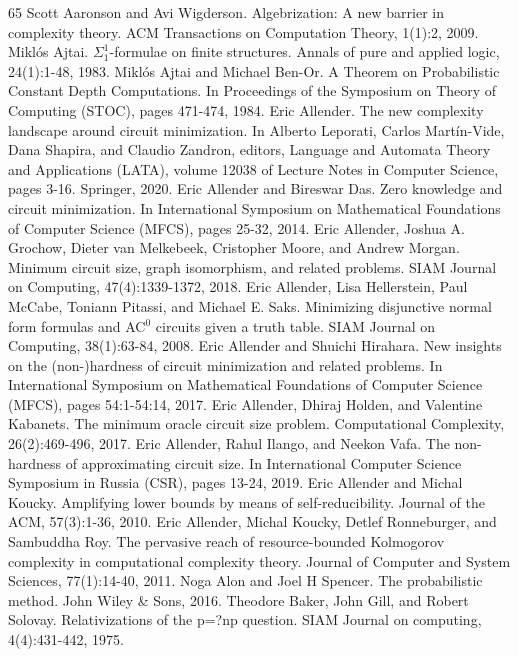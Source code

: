 \begin{thebibliography}{65}
 Scott Aaronson and Avi Wigderson. Algebrization: A new barrier in complexity theory. ACM Transactions on Computation Theory, 1(1):2, 2009.
 Miklós Ajtai. $\Sigma^1_1$-formulae on finite structures. Annals of pure and applied logic, 24(1):1-48, 1983.
 Miklós Ajtai and Michael Ben-Or. A Theorem on Probabilistic Constant Depth Computations. In Proceedings of the Symposium on Theory of Computing (STOC), pages 471-474, 1984.
 Eric Allender. The new complexity landscape around circuit minimization. In Alberto Leporati, Carlos Martín-Vide, Dana Shapira, and Claudio Zandron, editors, Language and Automata Theory and Applications (LATA), volume 12038 of Lecture Notes in Computer Science, pages 3-16. Springer, 2020.
 Eric Allender and Bireswar Das. Zero knowledge and circuit minimization. In International Symposium on Mathematical Foundations of Computer Science (MFCS), pages 25-32, 2014.
 Eric Allender, Joshua A. Grochow, Dieter van Melkebeek, Cristopher Moore, and Andrew Morgan. Minimum circuit size, graph isomorphism, and related problems. SIAM Journal on Computing, 47(4):1339-1372, 2018.
 Eric Allender, Lisa Hellerstein, Paul McCabe, Toniann Pitassi, and Michael E. Saks. Minimizing disjunctive normal form formulas and AC$^0$ circuits given a truth table. SIAM Journal on Computing, 38(1):63-84, 2008.
 Eric Allender and Shuichi Hirahara. New insights on the (non-)hardness of circuit minimization and related problems. In International Symposium on Mathematical Foundations of Computer Science (MFCS), pages 54:1-54:14, 2017.
 Eric Allender, Dhiraj Holden, and Valentine Kabanets. The minimum oracle circuit size problem. Computational Complexity, 26(2):469-496, 2017.
 Eric Allender, Rahul Ilango, and Neekon Vafa. The non-hardness of approximating circuit size. In International Computer Science Symposium in Russia (CSR), pages 13-24, 2019.
 Eric Allender and Michal Koucky. Amplifying lower bounds by means of self-reducibility. Journal of the ACM, 57(3):1-36, 2010.
 Eric Allender, Michal Koucky, Detlef Ronneburger, and Sambuddha Roy. The pervasive reach of resource-bounded Kolmogorov complexity in computational complexity theory. Journal of Computer and System Sciences, 77(1):14-40, 2011.
 Noga Alon and Joel H Spencer. The probabilistic method. John Wiley \& Sons, 2016.
 Theodore Baker, John Gill, and Robert Solovay. Relativizations of the p=?np question. SIAM Journal on computing, 4(4):431-442, 1975.

\end{thebibliography}
